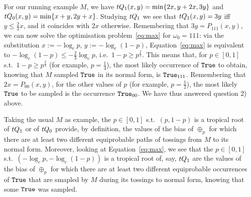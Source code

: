 For our running example $M$, we have $\trop Q_1(x,y)=\min\set{2x,y+2x,3y}$ and $\trop Q_0(x,y)=\min\set{x+y,2y+x}$.
Studying $\trop Q_1$ %
we see that $\trop Q_1(x,y)=3y$ iff $y\leq \frac{2}{3}x$, and it coincides with $2x$ otherwise.
Remembering that $3y=P_{111}(x,y)$, we can now solve the optimisation problem~\ref{eq:max} for $\omega_0=111$:
via the substitution $x:=-\log_c p$, $y:=-\log_c (1-p)$, Equation~\ref{eq:max} is equivalent to $-\log_c (1-p)\leq -\frac{2}{3}\log_c p$, i.e.\ $1-p\geq p^{\frac{2}{3}}$.
This means that, for $p\in[0,1]$ s.t.\ $1-p\geq p^{\frac{2}{3}}$ (for example, $p=\frac{1}{4}$), the most likely occurrence of $\mathtt{True}$ to obtain, knowing that $M$ sampled $\mathtt{True}$ in its normal form, is $\mathtt{True}_{111}$.
Remembering that $2x=P_{00}(x,y)$, for the other values of $p$ (for example, $p=\frac{1}{2}$), the most likely $\mathtt{True}$ to be sampled is the occurrence $\mathtt{True}_{00}$.
We have thus answered question 2) above.

\begin{remark}\label{rem:troproots}
 Taking the usual $M$ as example, the $p\in[0,1]$ s.t.\ $(p,1-p)$ is a tropical root of $\trop Q_1$ or of $\trop Q_0$ provide, by definition, the values of the bias of $\oplus_p$ for which there are at least two different equiprobable paths of tossings from $M$ to its normal form.
 Moreover, looking at Equation~\ref{eq:max}, we see that the $p\in[0,1]$ s.t.\ $(-\log_c p,-\log_c(1-p))$ is a tropical root of, say, $\trop Q_1$ are the values of the bias of $\oplus_p$ for which there are at least two different equiprobable occurrences of $\mathtt{True}$ that are smapled by $M$ during its tossings to normal form, knowing that some $\mathtt{True}$ was sampled.
\end{remark}
